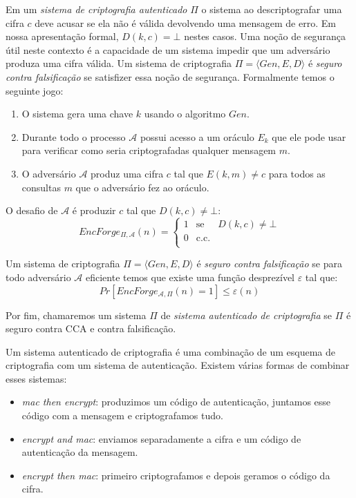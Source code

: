 Em um {\em sistema de criptografia autenticado} $\Pi$ o sistema ao descriptografar uma cifra $c$ deve acusar se ela não é válida devolvendo uma mensagem de erro.
Em nossa apresentação formal, $D(k,c) = \bot$ nestes casos.
Uma noção de segurança útil neste contexto é a capacidade de um sistema impedir que um adversário produza uma cifra válida.
Um sistema de criptografia $\Pi = \langle Gen, E, D \rangle$ é {\em seguro contra falsificação} se satisfizer essa noção de segurança.
Formalmente temos o seguinte jogo:
\begin{enumerate}
\item O sistema gera uma chave $k$ usando o algoritmo $Gen$.
\item Durante todo o processo $\mathcal{A}$ possui acesso a um oráculo $E_k$ que ele pode usar para verificar como seria criptografadas qualquer mensagem $m$.
\item O adversário $\mathcal{A}$ produz uma cifra $c$ tal que $E(k,m) \neq c$ para todos as consultas $m$ que o adversário fez ao oráculo.
\end{enumerate}

O desafio de $\mathcal{A}$ é produzir $c$ tal que $D(k,c) \neq \bot$:
\begin{displaymath}
  EncForge_{\Pi, \mathcal{A}}(n) = \left\{
    \begin{array}{lcl}
      1 & \textrm{se} & D(k,c) \neq \bot\\
      0 & \textrm{c.c.} &\\
    \end{array}
    \right.
\end{displaymath}

Um sistema de criptografia $\Pi = \langle Gen, E, D \rangle$ é {\em seguro contra falsificação} se para todo adversário $\mathcal{A}$ eficiente temos que existe uma função desprezível $\varepsilon$ tal que:
\begin{displaymath}
  Pr[EncForge_{\mathcal{A},\Pi}(n) = 1] \leq \varepsilon(n)
\end{displaymath}

Por fim, chamaremos um sistema $\Pi$ de {\em sistema autenticado de criptografia} se $\Pi$ é seguro contra CCA e contra falsificação.

Um sistema autenticado de criptografia é uma combinação de um esquema de criptografia com um sistema de autenticação.
Existem várias formas de combinar esses sistemas: 
\begin{itemize}
\item {\em mac then encrypt}: produzimos um código de autenticação, juntamos esse código com a mensagem e criptografamos tudo.
\item {\em encrypt and mac}: enviamos separadamente a cifra e um código de autenticação da mensagem.
\item {\em encrypt then mac}: primeiro criptografamos e depois geramos o código da cifra.
\end{itemize}

